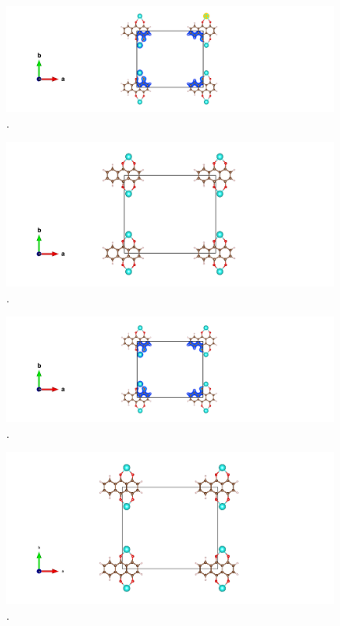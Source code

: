 \documentclass{article}
\begin{document}
  \begin{figure}[H]
      \centering
      \includegraphics[width = 11cm]{../fig/Yb_staticbefore_CHGCAR.png}
      \caption{. }
      \label{fig:Yb_staticbefore_CHGCAR}
  \end{figure}

  \begin{figure}[H]
      \centering
      \includegraphics[width = 11cm]{../fig/Yb_relax_CONTCAR.png}
      \caption{. }
      \label{fig:Yb_relax_CONTCAR}
  \end{figure}

  \begin{figure}[H]
      \centering
      \includegraphics[width = 11cm]{../fig/Yb_relax_CHGCAR.png}
      \caption{. }
      \label{fig:Yb_relax_CHGCAR}
  \end{figure}

  \iffalse
  \begin{figure}[H]
      \centering
      \includegraphics[width = 11cm]{../fig/Yb_staticafter_CONTCAR.png}
      \caption{. }
      \label{fig:Yb_staticafter_CONTCAR}
  \end{figure}
\end{document}
